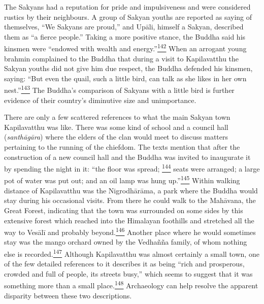 The Sakyans had a reputation for pride and impulsiveness and were
considered rustics by their neighbours. A group of Sakyan youths are
reported as saying of themselves, ``We Sakyans are proud,'' and Upāli,
himself a Sakyan, described them as ``a fierce people.'' Taking a more
positive stance, the Buddha said his kinsmen were ``endowed with wealth
and
energy.''\label{footprints_split_008.html_fnref142}\hyperref[footprints_split_024.htmlux5cux23fn142]{\textsuperscript{142}}
When an arrogant young brahmin complained to the Buddha that during a
visit to Kapilavatthu the Sakyan youths did not give him due respect,
the Buddha defended his kinsmen, saying: ``But even the quail, such a
little bird, can talk as she likes in her own
nest.''\label{footprints_split_008.html_fnref143}\hyperref[footprints_split_024.htmlux5cux23fn143]{\textsuperscript{143}}
The Buddha's comparison of Sakyans with a little bird is further
evidence of their country's diminutive size and unimportance.

There are only a few scattered references to what the main Sakyan town
Kapilavatthu was like. There was some kind of school and a council hall
(\emph{santhāgāra}) where the elders of the clan would meet to discuss
matters pertaining to the running of the chiefdom. The texts mention
that after the construction of a new council hall and the Buddha was
invited to inaugurate it by spending the night in it: ``the floor was
spread;
\label{footprints_split_008.html_fnref144}\hyperref[footprints_split_024.htmlux5cux23fn144]{\textsuperscript{144}}
seats were arranged; a large pot of water was put out; and an oil lamp
was hung
up.''\label{footprints_split_008.html_fnref145}\hyperref[footprints_split_024.htmlux5cux23fn145]{\textsuperscript{145}}
Within walking distance of Kapilavatthu was the Nigrodhārāma, a park
where the Buddha would stay during his occasional visits. From there he
could walk to the Mahāvana, the Great Forest, indicating that the town
was surrounded on some sides by this extensive forest which reached into
the Himalayan foothills and stretched all the way to Vesālī and probably
beyond.\label{footprints_split_008.html_fnref146}\hyperref[footprints_split_024.htmlux5cux23fn146]{\textsuperscript{146}}
Another place where he would sometimes stay was the mango orchard owned
by the Vedhañña family, of whom nothing else is
recorded.\label{footprints_split_008.html_fnref147}\hyperref[footprints_split_024.htmlux5cux23fn147]{\textsuperscript{147}}
Although Kapilavatthu was almost certainly a small town, one of the few
detailed references to it describes it as being ``rich and prosperous,
crowded and full of people, its streets busy,'' which seems to suggest
that it was something more than a small
place.\label{footprints_split_008.html_fnref148}\hyperref[footprints_split_024.htmlux5cux23fn148]{\textsuperscript{148}}
Archaeology can help resolve the apparent disparity between these two
descriptions.

